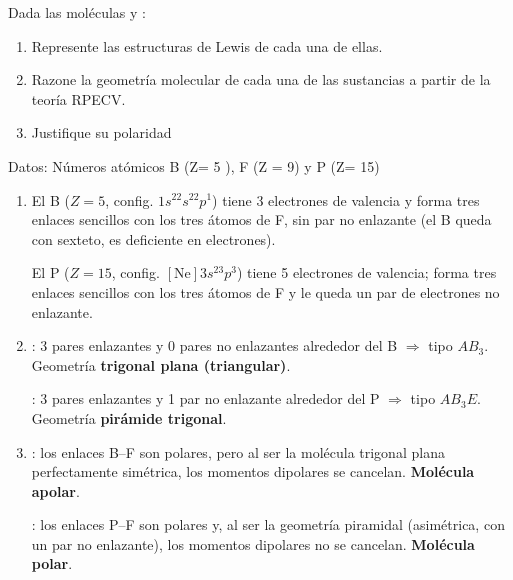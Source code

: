 \begin{exerciseEVAU}
    Dada las moléculas  y :
    \begin{enumerate}[label=\letraminuscula]
        \item Represente las estructuras de Lewis de cada una de ellas.
        \item Razone la geometría molecular de cada una de las sustancias a partir de la teoría RPECV.
        \item Justifique su polaridad
    \end{enumerate}
    Datos: Números atómicos B (Z= 5 ), F (Z = 9) y P (Z= 15)

    \begin{solu}
        \begin{enumerate}[label=\letraminuscula]
            \item El B (\(Z=5\), config. \(1s^22s^22p^1\)) tiene 3 electrones de valencia y forma tres enlaces sencillos con los tres átomos de F, sin par no enlazante (el B queda con sexteto, es deficiente en electrones).

            El P (\(Z=15\), config. \([\text{Ne}]3s^23p^3\)) tiene 5 electrones de valencia; forma tres enlaces sencillos con los tres átomos de F y le queda un par de electrones no enlazante.

            \item \textbf{}: 3 pares enlazantes y 0 pares no enlazantes alrededor del B $\Rightarrow$ tipo \(AB_3\). Geometría \textbf{trigonal plana (triangular)}.

            \textbf{}: 3 pares enlazantes y 1 par no enlazante alrededor del P $\Rightarrow$ tipo \(AB_3E\). Geometría \textbf{pirámide trigonal}.

            \item \textbf{}: los enlaces B--F son polares, pero al ser la molécula trigonal plana perfectamente simétrica, los momentos dipolares se cancelan. \textbf{Molécula apolar}.

            \textbf{}: los enlaces P--F son polares y, al ser la geometría piramidal (asimétrica, con un par no enlazante), los momentos dipolares no se cancelan. \textbf{Molécula polar}.
        \end{enumerate}
    \end{solu}
\end{exerciseEVAU}

